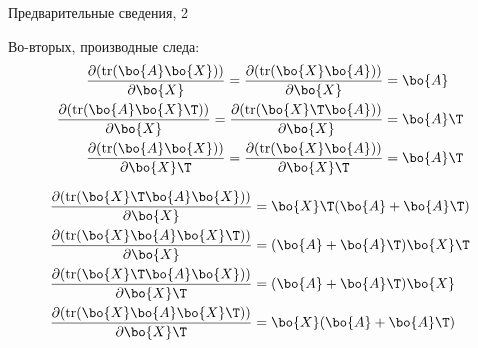\documentclass{beamer}
\begin{document}
\begin{frame}{Предварительные сведения, 2}
	\begin{flushleft}
		
		Во-вторых, производные следа:
		\begin{align}
			\frac{\partial ( \text{tr}(\bo{A} \bo{X}) )}{\partial \bo{X}} = 
			\frac{\partial ( \text{tr}(\bo{X}\bo{A}) )}{\partial \bo{X}} 
			&= 
			\bo{A}
			\\
			\frac{\partial ( \text{tr}(\bo{A} \bo{X}\T) )}{\partial \bo{X}} = 
			\frac{\partial ( \text{tr}(\bo{X}\T\bo{A}) )}{\partial \bo{X}} 
			&= 
			\bo{A}\T	
			\\
			\frac{\partial ( \text{tr}(\bo{A} \bo{X}) )}{\partial \bo{X}\T} = 
			\frac{\partial ( \text{tr}(\bo{X}\bo{A}) )}{\partial \bo{X}\T} 
			&= 
			\bo{A}\T		
		\end{align}
		
		\begin{align}
			\frac{\partial ( \text{tr}(\bo{X}\T \bo{A} \bo{X}) )}{\partial \bo{X}} 
			&=
			\bo{X}\T (\bo{A} + \bo{A}\T)
			\\
			\frac{\partial ( \text{tr}(\bo{X} \bo{A} \bo{X}\T) )}{\partial \bo{X}} 
			&=
			(\bo{A} + \bo{A}\T) \bo{X}\T
			\\
			\frac{\partial ( \text{tr}(\bo{X}\T \bo{A} \bo{X}) )}{\partial \bo{X}\T} 
			&=
			(\bo{A} + \bo{A}\T) \bo{X}
			\\
			\frac{\partial ( \text{tr}(\bo{X} \bo{A} \bo{X}\T) )}{\partial \bo{X}\T} 
			&=
			\bo{X}(\bo{A} + \bo{A}\T)
		\end{align}
		
		
		
	\end{flushleft}
\end{frame}
\end{document}
